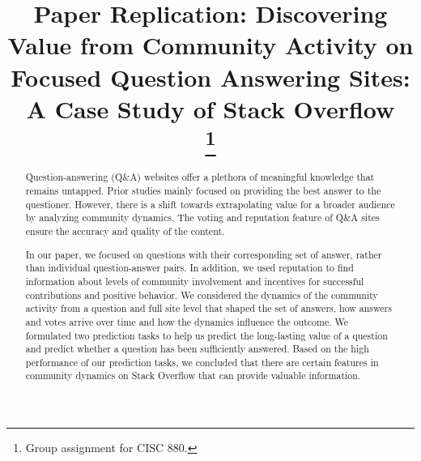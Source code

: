 \documentclass[conference]{IEEEtran}
\begin{document}
\title{Paper Replication: Discovering Value from Community Activity on Focused Question Answering Sites: A Case Study of Stack Overflow\\
\thanks{Group assignment for CISC 880.}
}

\author{
}

\maketitle

\begin{abstract}

Question-answering (Q\&A) websites offer a plethora of meaningful knowledge that remains untapped. Prior studies mainly focused on providing the best answer to the questioner. However, there is a shift towards extrapolating value for a broader audience by analyzing community dynamics. The voting and reputation feature of Q\&A sites ensure the accuracy and quality of the content.


In our paper, we focused on questions with their corresponding set of answer, rather than individual question-answer pairs. In addition, we used reputation to find information about levels of community involvement and incentives for successful contributions and positive behavior. We considered the dynamics of the community activity from a question and full site level that shaped the set of answers, how answers and votes arrive over time and how the dynamics influence the outcome. We formulated two prediction tasks to help us predict the long-lasting value of a question and predict whether a question has been sufficiently answered. Based on the high performance of our prediction tasks, we concluded that there are certain features in community dynamics on Stack Overflow that can provide valuable information.


\end{abstract}
\end{document}
